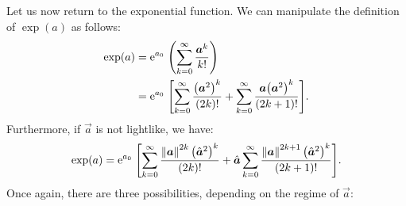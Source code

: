 Let us now return to the exponential function. We can manipulate the definition of $\exp(a)$ as follows:
\begin{equation*}
    \begin{split}
        \exp(a) &= \ec^{a_0}\;\qty(\sum_{k=0}^\infty \frac{\vec{a}^k}{k!} ) \\
                &= \ec^{a_0}\;\qty[\sum_{k=0}^\infty \frac{\qty(\vec{a}^2)^k}{(2k)!}  + \sum_{k=0}^\infty \frac{\vec{a}\qty(\vec{a}^2)^k}{(2k+1)!}]. \\
    \end{split}
\end{equation*}
Furthermore, if $\vec{a}$ is not lightlike, we have:
\begin{equation*}
    \exp(a) = \ec^{a_0}\;\qty[\sum_{k=0}^\infty \frac{\norm{\vec{a}}^{2k}\, \qty(\uvec{a}^2)^k}{(2k)!}  + \uvec{a}\sum_{k=0}^\infty \frac{\norm{\vec{a}}^{2k+1} \, \qty(\uvec{a}^2)^k}{(2k+1)!}].
\end{equation*}
Once again, there are three possibilities, depending on the regime of $\vec{a}$:
